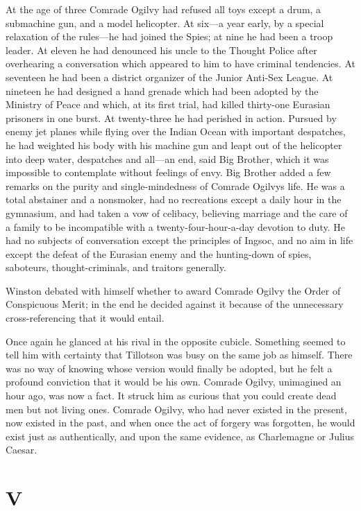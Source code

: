 At the age of three Comrade Ogilvy had refused all toys except a drum, a
submachine gun, and a model helicopter. At six---a year early, by a
special relaxation of the rules---he had joined the Spies; at nine he
had been a troop leader. At eleven he had denounced his uncle to the
Thought Police after overhearing a conversation which appeared to him to
have criminal tendencies. At seventeen he had been a district organizer
of the Junior Anti-Sex League. At nineteen he had designed a hand
grenade which had been adopted by the Ministry of Peace and which, at
its first trial, had killed thirty-one Eurasian prisoners in one burst.
At twenty-three he had perished in action. Pursued by enemy jet planes
while flying over the Indian Ocean with important despatches, he had
weighted his body with his machine gun and leapt out of the helicopter
into deep water, despatches and all---an end, said Big Brother, which it
was impossible to contemplate without feelings of envy. Big Brother
added a few remarks on the purity and single-mindedness of Comrade
Ogilvy\textquotesingle s life. He was a total abstainer and a nonsmoker,
had no recreations except a daily hour in the gymnasium, and had taken a
vow of celibacy, believing marriage and the care of a family to be
incompatible with a twenty-four-hour-a-day devotion to duty. He had no
subjects of conversation except the principles of Ingsoc, and no aim in
life except the defeat of the Eurasian enemy and the hunting-down of
spies, saboteurs, thought-criminals, and traitors generally.

Winston debated with himself whether to award Comrade Ogilvy the Order
of Conspicuous Merit; in the end he decided against it because of the
unnecessary cross-referencing that it would entail.

Once again he glanced at his rival in the opposite cubicle. Something
seemed to tell him with certainty that Tillotson was busy on the same
job as himself. There was no way of knowing whose version would finally
be adopted, but he felt a profound conviction that it would be his own.
Comrade Ogilvy, unimagined an hour ago, was now a fact. It struck him as
curious that you could create dead men but not living ones. Comrade
Ogilvy, who had never existed in the present, now existed in the past,
and when once the act of forgery was forgotten, he would exist just as
authentically, and upon the same evidence, as Charlemagne or Julius
Caesar.


\section{V}\label{v}

